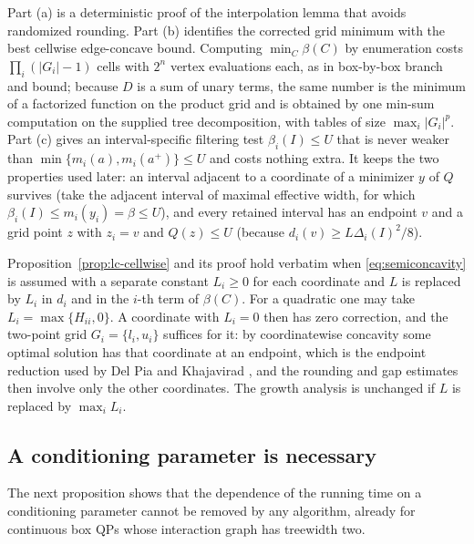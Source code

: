 \begin{remark}\label{rem:lc-cellwise}
Part (a) is a deterministic proof of the interpolation lemma that avoids
randomized rounding. Part (b) identifies the corrected grid minimum with
the best cellwise edge-concave bound. Computing $\min_C\beta(C)$ by
enumeration costs $\prod_i(|G_i|-1)$ cells with $2^n$ vertex evaluations
each, as in box-by-box branch and bound; because $D$ is a sum of unary
terms, the same number is the minimum of a factorized function on the
product grid and is obtained by one min-sum computation on the supplied
tree decomposition, with tables of size $\max_i|G_i|^p$. Part (c)
gives an interval-specific filtering test $\beta_i(I)\le U$ that is
never weaker than $\min\{m_i(a),m_i(a^+)\}\le U$ and costs nothing extra.
It keeps the two properties used later: an interval adjacent to a
coordinate of a minimizer $y$ of $Q$ survives (take the adjacent interval of
maximal effective width, for which $\beta_i(I)\le m_i(y_i)=\beta\le U$),
and every retained interval has an endpoint $v$ and a grid point $z$ with
$z_i=v$ and $Q(z)\le U$ (because $d_i(v)\ge L\Delta_i(I)^2/8$).
\end{remark}

\begin{remark}\label{rem:lc-coordinate-L}
Proposition~\ref{prop:lc-cellwise} and its proof hold verbatim when
\eqref{eq:semiconcavity} is assumed with a separate constant $L_i\ge0$ for
each coordinate and $L$ is replaced by $L_i$ in $d_i$ and in the $i$-th term
of $\beta(C)$. For a quadratic one may take $L_i=\max\{H_{ii},0\}$. A
coordinate with $L_i=0$ then has zero correction, and the two-point grid
$G_i=\{l_i,u_i\}$ suffices for it: by coordinatewise concavity some optimal
solution has that coordinate at an endpoint, which is the endpoint
reduction used by Del Pia and Khajavirad \cite{DelPiaKhajavirad2026}, and
the rounding and gap estimates then involve only the other coordinates. The
growth analysis is unchanged if $L$ is replaced by $\max_iL_i$.
\end{remark}

\subsection{A conditioning parameter is necessary}\label{sec:lc-necessity}

The next proposition shows that the dependence of the running time on a
conditioning parameter cannot be removed by any algorithm, already for
continuous box QPs whose interaction graph has treewidth two.

